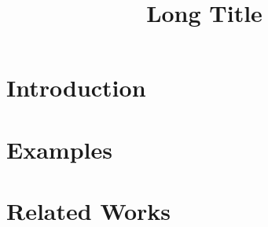 \documentclass[sigconf]{acmart}
\begin{document}
\title[Short Title]{Long Title}





\begin{abstract}

\end{abstract}

\keywords{}

\maketitle

\section{Introduction}\label{sec:intro}

\section{Examples}



\section{Related Works}




\balance
% 
\end{document}
